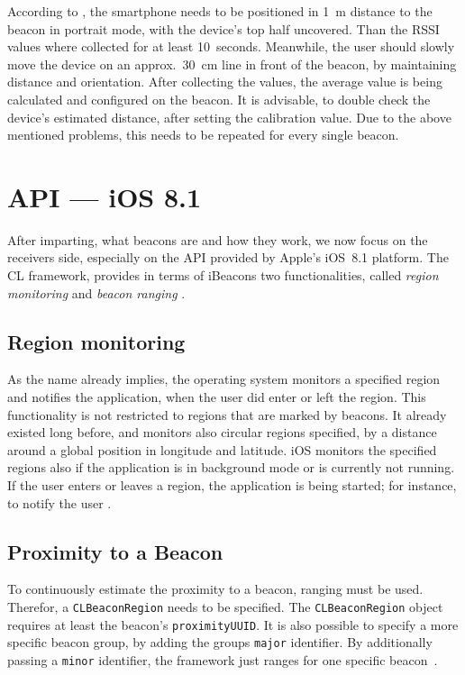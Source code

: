 According to \citet{apple:getting_started}, the smartphone needs to be positioned in 1~m distance to the beacon in portrait mode, with the device's top half uncovered. Than the \ac{RSSI} values where collected for at least 10~seconds. Meanwhile, the user should slowly move the device on an approx.\ 30~cm line in front of the beacon, by maintaining distance and orientation. After collecting the values, the average value is being calculated and configured on the beacon. It is advisable, to double check the device's estimated distance, after setting the calibration value. Due to the above mentioned problems, this needs to be repeated for every single beacon.

\section{API --- iOS 8.1}
After imparting, what beacons are and how they work, we now focus on the receivers side, especially on the \acs{API} provided by Apple's iOS~8.1 platform. The \ac{CL} framework, provides in terms of iBeacons two functionalities, called \emph{region monitoring} and \emph{beacon ranging} \citep{apple:ios_doc_cl}.

\subsection*{Region monitoring}
As the name already implies, the operating system monitors a specified region and notifies the application, when the user did enter or left the region. This functionality is not restricted to regions that are marked by beacons. It already existed long before, and monitors also circular regions specified, by a distance around a global position in longitude and latitude.
iOS monitors the specified regions also if the application is in background mode or is currently not running. If the user enters or leaves a region, the application is being started; for instance, to notify the user \citep{apple:wwdc_2012_bruins,apple:wwdc_2013_bruins,apple:ios_doc_cl}.

\subsection*{Proximity to a Beacon}
To continuously estimate the proximity to a beacon, ranging must be used. Therefor, a \texttt{CLBeaconRegion} needs to be specified. The \texttt{CLBeaconRegion} object requires at least the beacon's \texttt{proximityUUID}. It is also possible to specify a more specific beacon group, by adding the groups \texttt{major} identifier. By additionally passing a \texttt{minor} identifier, the framework just ranges for one specific beacon~\citep{apple:wwdc_2013_bruins,apple:ios_doc_cl}.

